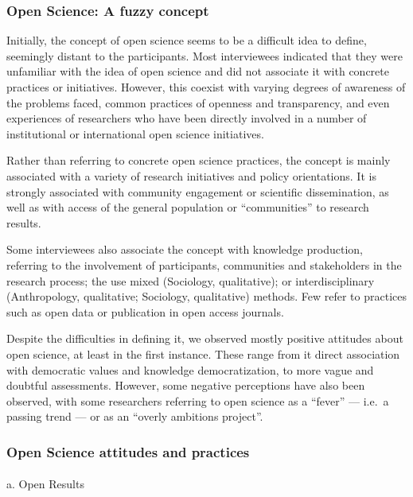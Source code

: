 \documentclass[
  letterpaper,
]{article}
\makeatletter
\let\oldparagraph\paragraph
\renewcommand{\paragraph}{
    \@ifstar
      \xxxParagraphStar
      \xxxParagraphNoStar
  }
\newcommand{\xxxParagraphStar}[1]{\oldparagraph*{#1}\mbox{}}
\newcommand{\xxxParagraphNoStar}[1]{\oldparagraph{#1}\mbox{}}
\makeatother
\begin{document}
\subsubsection{\texorpdfstring{\textbf{Open Science: A fuzzy
concept}}{Open Science: A fuzzy concept}}\label{open-science-a-fuzzy-concept}

Initially, the concept of open science seems to be a difficult idea to
define, seemingly distant to the participants. Most interviewees
indicated that they were unfamiliar with the idea of open science and
did not associate it with concrete practices or initiatives. However,
this coexist with varying degrees of awareness of the problems faced,
common practices of openness and transparency, and even experiences of
researchers who have been directly involved in a number of institutional
or international open science initiatives.

Rather than referring to concrete open science practices, the concept is
mainly associated with a variety of research initiatives and policy
orientations. It is strongly associated with community engagement or
scientific dissemination, as well as with access of the general
population or ``communities'' to research results.

Some interviewees also associate the concept with knowledge production,
referring to the involvement of participants, communities and
stakeholders in the research process; the use mixed (Sociology,
qualitative); or interdisciplinary (Anthropology, qualitative;
Sociology, qualitative) methods. Few refer to practices such as open
data or publication in open access journals.

Despite the difficulties in defining it, we observed mostly positive
attitudes about open science, at least in the first instance. These
range from it direct association with democratic values and knowledge
democratization, to more vague and doubtful assessments. However, some
negative perceptions have also been observed, with some researchers
referring to open science as a ``fever'' --- i.e.~a passing trend --- or
as an ``overly ambitions project''.

\subsubsection{\texorpdfstring{\textbf{Open Science attitudes and
practices}}{Open Science attitudes and practices}}\label{open-science-attitudes-and-practices}

\paragraph{a. Open Results}\label{a.-open-results}
\end{document}
